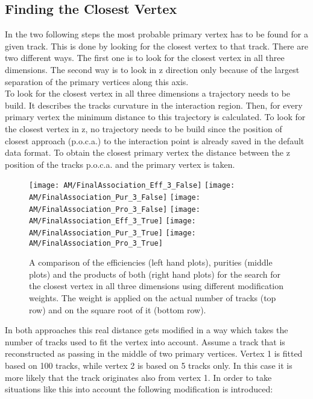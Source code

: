 \subsection{Finding the Closest Vertex\label{sec:AMWFCV}}

In the two following steps the most probable primary vertex has to be found for a given track. This is done by looking for the closest vertex to that track. There are two different ways. The first one is to look for the closest vertex in all three dimensions. The second way is to look in z direction only because of the largest separation of the primary vertices along this axis. \\
To look for the closest vertex in all three dimensions a trajectory needs to be build. It describes the tracks curvature in the interaction region. Then, for every primary vertex the minimum distance to this trajectory is calculated. To look for the closest vertex in z, no trajectory needs to be build since the position of closest approach (p.o.c.a.) to the interaction point is already saved in the default data format. To obtain the closest primary vertex the distance between the z position of the tracks p.o.c.a. and the primary vertex is taken. \\

\begin{figure}[!ht]
    \centering
    \texttt{[image: AM/FinalAssociation\_Eff\_3\_False]}
    \texttt{[image: AM/FinalAssociation\_Pur\_3\_False]}
    \texttt{[image: AM/FinalAssociation\_Pro\_3\_False]}
    \newline
    \texttt{[image: AM/FinalAssociation\_Eff\_3\_True]}
    \texttt{[image: AM/FinalAssociation\_Pur\_3\_True]}
    \texttt{[image: AM/FinalAssociation\_Pro\_3\_True]}
    \caption[Efficiency, purity and their product using different modification weights for the search in three dimensions.]{A comparison of the efficiencies (left hand plots), purities (middle plots) and the products of both (right hand plots) for the search for the closest vertex in all three dimensions using different modification weights. The weight is applied on the actual number of tracks (top row) and on the square root of it (bottom row).\label{plot:AMWFCV3D}}
\end{figure}

In both approaches this real distance gets modified in a way which takes the number of tracks used to fit the vertex into account. Assume a track that is reconstructed as passing in the middle of two primary vertices. Vertex 1 is fitted based on 100 tracks, while vertex 2 is based on 5 tracks only. In this case it is more likely that the track originates also from vertex 1. In order to take situations like this into account the following modification is introduced:

